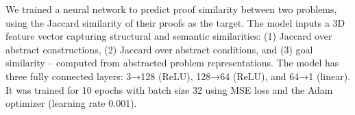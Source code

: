 


We trained a neural network to predict proof similarity between two problems, using the Jaccard similarity of their proofs as the target. The model inputs a 3D feature vector capturing structural and semantic similarities: (1) Jaccard over abstract constructions, (2) Jaccard over abstract conditions, and (3) goal similarity -- computed from abstracted problem representations.
The model has three fully connected layers: 3→128 (ReLU), 128→64 (ReLU), and 64→1 (linear). It was trained for 10 epochs with batch size 32 using MSE loss and the Adam optimizer (learning rate 0.001).
